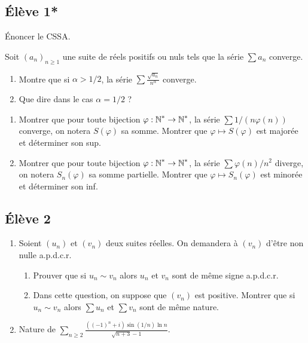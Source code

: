 \documentclass[10pt]{scrartcl}
\title{}
\author{}
\date{}
\begin{document}
    \subsection*{Élève 1*}
    \begin{qc}
        Énoncer le CSSA.
    \end{qc}

    \begin{exo}
        Soit $(a_n)_{n\geq 1}$ une suite de réels positifs ou nuls tels que la série  $\sum a_n$ converge.
        \begin{enumerate}
            \item Montre que si $\alpha>1/2$, la série $\sum\frac{\sqrt{a_n}}{n^\alpha}$ converge.
            \item Que dire dans le cas $\alpha = 1/2$ ?
        \end{enumerate}
    \end{exo}

    \begin{exo}
        \hfill
        \begin{enumerate}
            \item Montrer que pour toute bijection $\varphi:\operatorname{\mathbb N}^*\to\operatorname{\mathbb N}^*$, la série $\sum 1/(n\varphi(n))$ converge, on notera $S(\varphi)$ sa somme. Montrer que $\varphi\mapsto S(\varphi)$ est majorée et déterminer son sup.
            \item Montrer que pour toute bijection $\varphi:\operatorname{\mathbb N}^*\to\operatorname{\mathbb N}^*$, la série $\sum \varphi(n)/n^2$ diverge, on notera $S_n(\varphi)$ sa somme partielle. Montrer que $\varphi\mapsto S_n(\varphi)$ est minorée et déterminer son inf.
        \end{enumerate}
    \end{exo}

    \subsection*{Élève 2}
    \begin{ccp}\hfill
        \begin{enumerate}
            \item Soient $(u_n)$ et $(v_n)$ deux suites réelles. On demandera à $(v_n)$ d'être non nulle a.p.d.c.r.
            \begin{enumerate}
                \item Prouver que si $u_n\sim v_n$ alors $u_n$ et $v_n$ sont de même signe a.p.d.c.r.
                \item Dans cette question, on suppose que $(v_n)$ est positive. 
                Montrer que si $u_n\sim v_n$ alors $\sum u_n$ et $\sum v_n$ sont de même nature.
            \end{enumerate}
            \item Nature de $\sum_{n\geq 2}\frac{((-1)^n+i)\sin(1/n)\ln n}{\sqrt{n+3}-1}$.
        \end{enumerate}
    \end{ccp}
\end{document}
